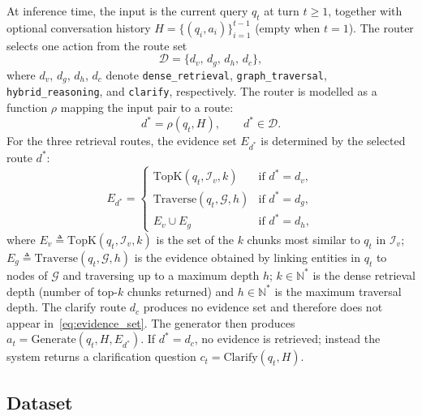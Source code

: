 \documentclass[pdflatex,sn-mathphys-num]{sn-jnl}
\begin{document}
At inference time, the input is the current query $q_t$ at turn $t\geq 1$,
together with optional conversation history $H=\{(q_i,a_i)\}_{i=1}^{t-1}$
(empty when $t=1$). The router selects one action from the route set
\begin{equation}
\mathcal{D}=\{d_v,\,d_g,\,d_h,\,d_c\},
\label{eq:route_set}
\end{equation}
where $d_v$, $d_g$, $d_h$, $d_c$ denote \texttt{dense\_retrieval},
\texttt{graph\_traversal}, \texttt{hybrid\_reasoning}, and \texttt{clarify},
respectively. The router is modelled as a function $\rho$ mapping the input
pair to a route:
\begin{equation}
d^* = \rho(q_t,H),\qquad d^*\in\mathcal{D}.
\label{eq:routing_function}
\end{equation}
For the three retrieval routes, the evidence set $E_{d^*}$ is determined by
the selected route $d^*$:
\begin{equation}
E_{d^*}=
\begin{cases}
\mathrm{TopK}(q_t,\mathcal{I}_v,k) & \text{if } d^*=d_v,\\[3pt]
\mathrm{Traverse}(q_t,\mathcal{G},h) & \text{if } d^*=d_g,\\[3pt]
E_v\cup E_g & \text{if } d^*=d_h,
\end{cases}
\label{eq:evidence_set}
\end{equation}
where $E_v\triangleq\mathrm{TopK}(q_t,\mathcal{I}_v,k)$ is the set of the $k$
chunks most similar to $q_t$ in $\mathcal{I}_v$;
$E_g\triangleq\mathrm{Traverse}(q_t,\mathcal{G},h)$ is the evidence obtained
by linking entities in $q_t$ to nodes of $\mathcal{G}$ and traversing up to a
maximum depth $h$; $k\in\mathbb{N}^{*}$ is the dense retrieval depth (number
of top-$k$ chunks returned) and $h\in\mathbb{N}^{*}$ is the maximum traversal
depth. The clarify route $d_c$ produces no evidence set and therefore does
not appear in~\eqref{eq:evidence_set}. The generator then produces
$a_t=\mathrm{Generate}(q_t,H,E_{d^*})$. If $d^*=d_c$, no evidence is
retrieved; instead the system returns a clarification question
$c_t=\mathrm{Clarify}(q_t,H)$.

\subsection{Dataset}\label{subsec:dataset}
\end{document}
